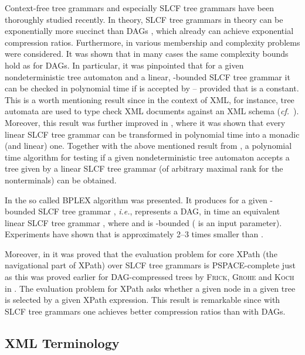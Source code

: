 \documentclass[12pt]{llncs}
\newcommand{\hairsp}{\hspace{1pt}}\newcommand{\TODO}{\textcolor{red}{\bf TODO!}\xspace}
\newcommand{\ie}{\mbox{\textit{i.\hairsp{}e.}}\xspace}
\newcommand{\cf}{\textit{cf.}~}
\begin{document}
Context-free tree grammars \cite{tata2007} and especially SLCF tree
grammars have been thoroughly studied recently. 
In theory, SLCF tree grammars in theory can be exponentially 
more succinct than DAGs \cite{Lohrey2006complexity}, which already can achieve exponential compression ratios.
Furthermore, in \cite{Lohrey2006complexity} various membership and
complexity problems were considered. It was shown that in many cases
the same complexity bounds hold as for DAGs. In particular, it was
pinpointed that for a given nondeterministic tree automaton 
and a linear, -bounded SLCF tree grammar  it can be
checked in polynomial time if  is accepted by
 -- provided that  is a constant. This is a worth
mentioning result since in the context of XML, for instance, 
tree automata are used to type check XML documents against an XML schema (\cf \cite{Murata05taxonomy,Neven02automata}).
Moreover, this result was further improved in
\cite{Lohrey09parameterreduction}, where it was shown 
that every linear SLCF tree grammar can be transformed in polynomial time into a monadic
(and linear) one. Together with the above mentioned result from
\cite{Lohrey2006complexity}, a polynomial time
algorithm for testing if a given nondeterministic tree automaton
accepts a tree given by a linear SLCF tree grammar 
(of arbitrary maximal rank for the nonterminals) can be obtained.

In \cite{Busatto08efficient} the so called BPLEX algorithm was
presented. It produces for a given -bounded SLCF tree grammar
, \ie,  represents a DAG, in time
 an equivalent linear SLCF tree grammar
, where
 and
 is -bounded 
( is an input parameter). Experiments have shown that  is approximately 2--3 times smaller than .

Moreover, in \cite{Lohrey09parameterreduction} it was proved that the
evaluation problem for core XPath (the navigational part of XPath)
over SLCF tree grammars is PSPACE-complete just as this was proved
earlier for DAG-compressed trees by \textsc{Frick}, \textsc{Grohe} and
\textsc{Koch} in \cite{Frick03query}. The evaluation problem for XPath
asks whether a given node in a given tree is selected by a given XPath
expression. This result is remarkable since with SLCF tree grammars
one achieves better compression 
ratios than with DAGs.

\subsection{XML Terminology}
\end{document}
